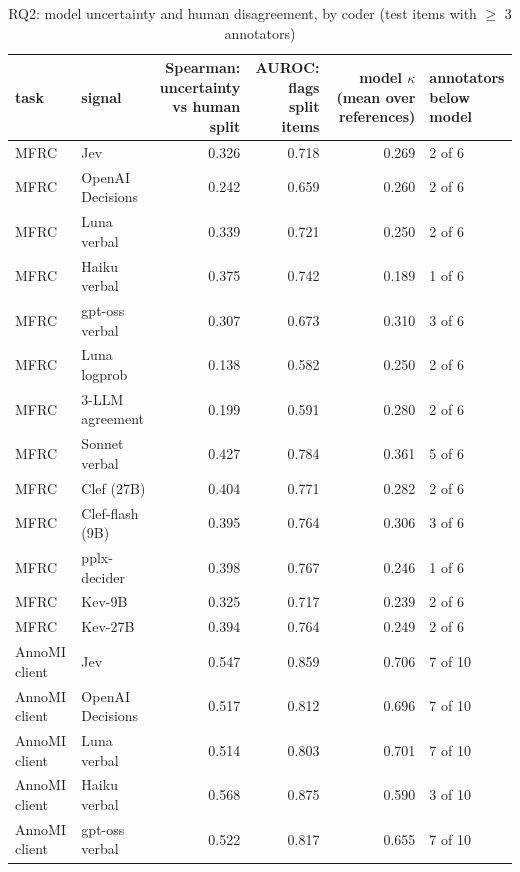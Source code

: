 \begin{table}[t]
\centering
\small
\caption{RQ2: model uncertainty and human disagreement, by coder (test items with $\geq$ 3 annotators)}
\label{tab:tab05_rq2}
\begin{adjustbox}{max width=\linewidth}
\begin{tabular}{llrrrl}
\toprule
task & signal & \makecell[br]{Spearman: \\{} uncertainty \\{} vs human \\{} split} & \makecell[br]{AUROC: flags \\{} split items} & \makecell[br]{model $\kappa$ \\{} (mean over \\{} references)} & \makecell[bl]{annotators \\{} below model} \\
\midrule
MFRC & Jev & 0.326 & 0.718 & 0.269 & 2 of 6 \\
MFRC & OpenAI Decisions & 0.242 & 0.659 & 0.260 & 2 of 6 \\
MFRC & Luna verbal & 0.339 & 0.721 & 0.250 & 2 of 6 \\
MFRC & Haiku verbal & 0.375 & 0.742 & 0.189 & 1 of 6 \\
MFRC & gpt-oss verbal & 0.307 & 0.673 & 0.310 & 3 of 6 \\
MFRC & Luna logprob & 0.138 & 0.582 & 0.250 & 2 of 6 \\
MFRC & 3-LLM agreement & 0.199 & 0.591 & 0.280 & 2 of 6 \\
MFRC & Sonnet verbal & 0.427 & 0.784 & 0.361 & 5 of 6 \\
MFRC & Clef (27B) & 0.404 & 0.771 & 0.282 & 2 of 6 \\
MFRC & Clef-flash (9B) & 0.395 & 0.764 & 0.306 & 3 of 6 \\
MFRC & pplx-decider & 0.398 & 0.767 & 0.246 & 1 of 6 \\
MFRC & Kev-9B & 0.325 & 0.717 & 0.239 & 2 of 6 \\
MFRC & Kev-27B & 0.394 & 0.764 & 0.249 & 2 of 6 \\
AnnoMI client & Jev & 0.547 & 0.859 & 0.706 & 7 of 10 \\
AnnoMI client & OpenAI Decisions & 0.517 & 0.812 & 0.696 & 7 of 10 \\
AnnoMI client & Luna verbal & 0.514 & 0.803 & 0.701 & 7 of 10 \\
AnnoMI client & Haiku verbal & 0.568 & 0.875 & 0.590 & 3 of 10 \\
AnnoMI client & gpt-oss verbal & 0.522 & 0.817 & 0.655 & 7 of 10 \\

\end{tabular}
\end{adjustbox}
\end{table}
